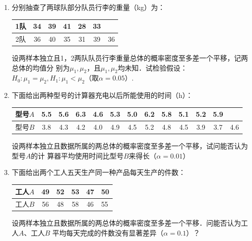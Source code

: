 \begin{enumerate}
    \item 分别抽查了两球队部分队员行李的重量（kg）为：   
    \renewcommand{\arraystretch}{1.3}
    \begin{table}[H]\centering
        \begin{tabular}{c|cccccc}
        1队 & 34 & 39 & 41 & 28 & 33 &    \\ \hline
        2队 & 36 & 40 & 35 & 31 & 39 & 36
        \end{tabular}
    \end{table}
    \renewcommand{\arraystretch}{1.0}
    设两样本独立且1，2两队队员行李重量总体的概率密度至多差一个平移，记两总体的均值分
    别为$\mu_1,\mu_2$，且$\mu_1,\mu_2$均未知．试检验假设：$H_0:\mu_1=\mu_2,H_1:\mu_1<\mu_2$（取$\alpha=0.05$）.




    



    \item 下面给出两种型号的计算器充电以后所能使用的时间（h）：
    \renewcommand{\arraystretch}{1.3}
    \begin{table}[H]\centering
        \begin{tabular}{c|cccccccccccc}
        型号$A$ & 5.5 & 5.6 & 6.3 & 4.6 & 5.3 & 5.0 & 6.2 & 5.8 & 5.1 & 5.2 & 5.9 &     \\ \hline
        型号$B$ & 3.8 & 4.3 & 4.2 & 4.0 & 4.9 & 4.5 & 5.2 & 4.8 & 4.5 & 3.9 & 3.7 & 4.6
        \end{tabular}
    \end{table}
    \renewcommand{\arraystretch}{1.0}
    设两样本独立且数据所属的两总体的概率密度至多差一个平移，试问能否认为型号$A$的计
    算器平均使用时间比型号$B$来得长（$\alpha=0.01$）





    \item 下面给出两个工人五天生产同一种产品每天生产的件数：
    \renewcommand{\arraystretch}{1.3}
    \begin{table}[H]\centering
        \begin{tabular}{c|ccccl}
        工人$A$ & 49 & 52 & 53 & 47 & 50 \\ \hline
        工人$B$ & 56 & 48 & 58 & 46 & 55
        \end{tabular}
    \end{table}
    \renewcommand{\arraystretch}{1.0}
    设两样本独立且数据所属的两总体的概率密度至多差一个平移．问能否认为工人$A$、工人$B$
    平均每天完成的件数没有显著差异（$\alpha=0.1$）？






\end{enumerate}
